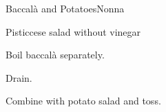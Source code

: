 \begin{recipe}{Baccal\`a and Potatoes}{Nonna}{}

\begin{ingredients}
\item {}
\item Pisticcese  salad without vinegar
\end{ingredients}

\begin{directions}
\item Boil baccal\`a separately.
\item Drain.
\item Combine with potato salad and toss.
\end{directions}

\end{recipe}
